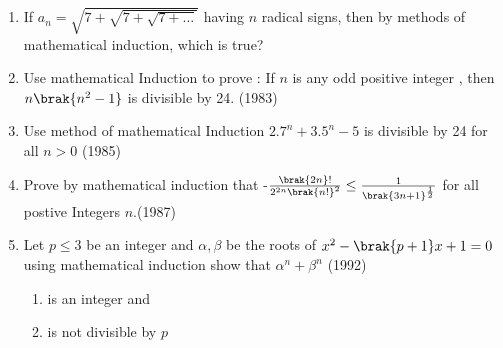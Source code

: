 \begin{enumerate}[label=\thesubsection.\arabic*,ref=\thesubsection.\theenumi]
%
\item If $a_n = \sqrt{7+\sqrt{7+\sqrt{7+...}}}$ having $n$ radical signs, then by methods of mathematical induction, which is true?
	\hfill{}
	\begin{enumerate}
	\end{enumerate}
 \item Use mathematical Induction to prove : If $n$ is any odd positive integer , then  $ n\brak{n^2-1} $ is divisible by 24.
		   \hfill{(1983)}
 \item Use method of mathematical Induction  $ 2.7^n +3.5^n-5 $ is divisible by 24 for all $ n>0 $ \hfill{(1985)}
 \item Prove by mathematical induction that -$\frac{\brak{2n}!}{2^{2n}\brak{n!}^2}\leq \frac{1}{\brak{3n+1}^{\frac{1}{2}}} $ for all postive Integers $n$.\hfill {(1987)}
  \item Let $ p \leq 3 $ be an integer and $ \alpha , \beta $ be  the roots of $ x^2-\brak{p+1}x+1=0 $ using mathematical induction show that $ \alpha^n  + \beta^n $ \hfill{(1992)}
		    \begin{enumerate}[label=(\roman*)]

			    \item is an integer and   
		    \item is not divisible by $ p $ \end{enumerate}
				    
\end{enumerate}

